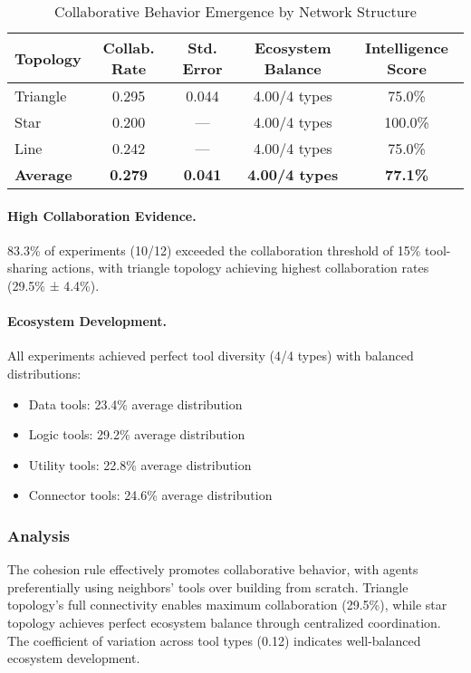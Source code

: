 \begin{table}[h]
\centering
\caption{Collaborative Behavior Emergence by Network Structure}
\label{tab:collaboration}
\begin{tabular}{@{}lcccc@{}}
\toprule
\textbf{Topology} & \textbf{Collab. Rate} & \textbf{Std. Error} & \textbf{Ecosystem Balance} & \textbf{Intelligence Score} \\
\midrule
Triangle & 0.295 & 0.044 & 4.00/4 types & 75.0\% \\
Star & 0.200 & --- & 4.00/4 types & 100.0\% \\
Line & 0.242 & --- & 4.00/4 types & 75.0\% \\
\midrule
\textbf{Average} & \textbf{0.279} & \textbf{0.041} & \textbf{4.00/4 types} & \textbf{77.1\%} \\
\bottomrule
\end{tabular}
\end{table}

\paragraph{High Collaboration Evidence.}
83.3\% of experiments (10/12) exceeded the collaboration threshold of 15\% tool-sharing actions, with triangle topology achieving highest collaboration rates (29.5\% ± 4.4\%).

\paragraph{Ecosystem Development.}
All experiments achieved perfect tool diversity (4/4 types) with balanced distributions:
\begin{itemize}
    \item Data tools: 23.4\% average distribution
    \item Logic tools: 29.2\% average distribution
    \item Utility tools: 22.8\% average distribution  
    \item Connector tools: 24.6\% average distribution
\end{itemize}

\subsubsection{Analysis}

The cohesion rule effectively promotes collaborative behavior, with agents preferentially using neighbors' tools over building from scratch. Triangle topology's full connectivity enables maximum collaboration (29.5\%), while star topology achieves perfect ecosystem balance through centralized coordination. The coefficient of variation across tool types (0.12) indicates well-balanced ecosystem development.


